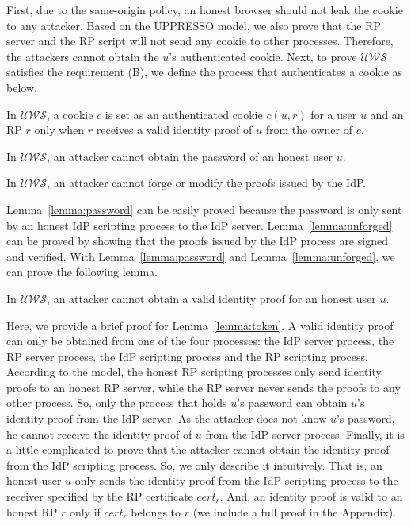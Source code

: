 First, due to the same-origin policy, an honest browser should not leak the cookie to any attacker. Based on the UPPRESSO model, we also prove that the RP server and the RP script will not send any cookie to other processes. Therefore, the attackers cannot obtain the $u$'s authenticated  cookie. Next, to prove $\mathcal{UWS}$ satisfies the requirement (B), we define the process that authenticates a cookie as below.
\begin{definition}
In $\mathcal{UWS}$, a cookie $c$ is set as an authenticated cookie $c(u,r)$ for a user $u$ and an RP $r$ only when $r$ receives a valid identity proof of $u$ from the owner of $c$.
\label{def:cookie}
\end{definition}
\vspace{-\topsep}
\begin{lemma}
In $\mathcal{UWS}$, an attacker cannot obtain the password of an honest user $u$.
\label{lemma:password}
\end{lemma}
\begin{lemma}
In $\mathcal{UWS}$, an attacker cannot forge or modify the proofs issued by the IdP.
\label{lemma:unforged}
\end{lemma}
\vspace{-\topsep}
Lemma~\ref{lemma:password} can be easily proved because the password is only sent by an honest IdP scripting process to the IdP server. Lemma~\ref{lemma:unforged} can be proved by showing that the proofs issued by the IdP process are signed and verified. With Lemma~\ref{lemma:password} and Lemma~\ref{lemma:unforged}, we can prove the following lemma.
\begin{lemma}
In $\mathcal{UWS}$, an attacker cannot obtain a valid identity proof for an honest user $u$.
\label{lemma:token}
\end{lemma}
\vspace{-\topsep}
Here, we provide a brief proof for Lemma~\ref{lemma:token}. A valid identity proof can only be obtained from one of the four processes: the IdP server process, the RP server process, the IdP scripting process and the RP scripting process. According to the model, the honest RP scripting processes only send identity proofs to an honest RP server, while the RP server never sends the proofs to any other process. So, only the process that holds $u$'s password can obtain $u$'s identity proof from the IdP server. As the attacker does not know $u$'s password, he cannot receive the identity proof of $u$ from the IdP server process. Finally, it is a little complicated to prove that the attacker cannot obtain the identity proof from the IdP scripting process. So, we only describe it intuitively. That is, an honest user $u$ only sends the identity proof from the IdP scripting process to the receiver specified by the RP certificate $cert_r$. And, an identity proof is valid to an honest RP $r$ only if $cert_r$ belongs to $r$ (we include a full proof in the Appendix).
